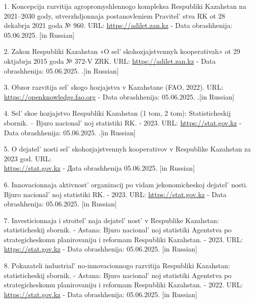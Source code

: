 \begin{references}
1. Koncepcija razvitija agropromyshlennogo kompleksa Respubliki Kazahstan
na 2021--2030 gody, utver\-zhdjonnaja postanovleniem
Pravitel' stva RK ot 28 dekabrja 2021 goda № 960.
URL: \href{https://adilet.zan.kz/rus/docs/P2100000960}{https://adilet.zan.kz} - Data obrashhenija:
05.06.2025. {[}in Russian{]}

2. Zakon Respubliki Kazahstan «O sel' skohozjajstvennyh
kooperativah» ot 29 oktjabrja 2015 goda № 372-V ZRK. URL:
\href{https://adilet.zan.kz/rus/docs/Z1500000372}{https://adilet.zan.kz} - Data obrashhenija:
05.06.2025. .{[}in Russian{]}

3. Obzor razvitija sel' skogo hozjajstva v Kazahstane
(FAO, 2022). URL:
\href{https://openknowledge.fao.org/bitstream/handle/20.500.14283/cc2651ru.pdf}{https://openknowledge.fao.org}
- Data obrashhenija: 05.06.2025. .{[}in Russian{]}

4. Sel' skoe hozjajstvo Respubliki Kazahstan (1 tom, 2
tom): Statisticheskij sbornik. -- Bjuro nacional' noj
statistiki RK. - 2023.
URL: \href{https://stat.gov.kz/ru/publication/collections/?year=2023\&name=17199\&period=year}{https://stat.gov.kz}
-Data obrashhenija: 05.06.2025. .{[}in Russian{]}

5. O dejatel' nosti sel' skohozjajstvennyh
kooperativov v Respublike Kazahstan za 2023 god. URL:\\
\href{https://stat.gov.kz/api/iblock/element/182382/file/ru/}{https://stat.gov.kz} - Дata
obrashhenija 05.06.2025. {[}in Russian{]}

6. Innovacionnaja aktivnost'{} organizacij po vidam
jekonomicheskoj dejatel' nosti. Bjuro
nacional' noj statistiki RK. - 2023. URL:
\href{https://stat.gov.kz/ru/industries/business-statistics/stat-inno-build/publications}{https://stat.gov.kz}
- Data obrashhenija: 05.06.2025. {[}in Russian{]}

7. Investicionnaja i stroitel' naja
dejatel' nost'{} v Respublike Kazahstan:
statisticheskij sbornik. - Astana: Bjuro nacional' noj
statistiki Agentstva po strategicheskomu planirovaniju i reformam
Respubliki Kazah\-stan. - 2023. URL:
\href{https://stat.gov.kz/ru/publication/collections/?year=2023\&name=16821\&period=year}{https://stat.gov.kz}
- Data obrashhenija: 05.06.2025. {[}in Russian{]}

8. Pokazateli industrial' no-innovacionnogo razvitija
Respubliki Kazahstan: statisticheskij sbornik. - Astana: Bjuro
nacional' noj statistiki Agentstva po strategicheskomu
planirovaniju i reformam Respubliki Kazah\-stan. - 2022.
URL: \href{https://stat.gov.kz/ru/publication/collections/?year=2022\&name=16147\&period}{https://stat.gov.kz}
- Data obrashhenija: 05.06.2025. {[}in Russian{]}


\end{references}

